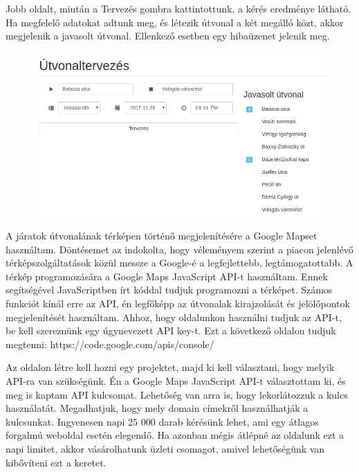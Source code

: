 Jobb oldalt, miután a Tervezés gombra kattintottunk, a kérés eredménye látható. Ha megfelelő adatokat adtunk meg, és létezik útvonal a két megálló közt, akkor megjelenik a javasolt útvonal. Ellenkező esetben egy hibaüzenet jelenik meg.

\begin{figure}[htb]
\centering
\includegraphics[scale=0.5]{kepek/trip_planner.png}
\caption{}
\label{fig:trip_planner}
\end{figure}


A járatok útvonalának térképen történő megjelenítésére a Google Mapset használtam. Döntésemet az indokolta, hogy véleményem szerint a piacon jelenlévő térképszolgáltatások közül messze a Google-é a legfejlettebb, legtámogatottabb. A térkép programozására a Google Maps JavaScript API-t használtam. Ennek segítségével JavaScriptben írt kóddal tudjuk programozni a térképet. Számos funkciót kínál erre az API, én legfőképp az útvonalak kirajzolását és jelölőpontok megjelenítését használtam. Ahhoz, hogy oldalunkon használni tudjuk az API-t, be kell szereznünk egy úgynevezett API key-t. Ezt a következő oldalon tudjuk megtenni: https://code.google.com/apis/console/

Az oldalon létre kell hozni egy projektet, majd ki kell választani, hogy melyik API-ra van szükségünk. Én a Google Maps JavaScript API-t választottam ki, és meg is kaptam API kulcsomat. Lehetőség van arra is, hogy lekorlátozzuk a kulcs használatát. Megadhatjuk, hogy mely domain címekről használhatják a kulcsunkat. Ingyenesen napi 25 000 darab kérésünk lehet, ami egy átlagos forgalmú weboldal esetén elegendő. Ha azonban mégis átlépné az oldalunk ezt a napi limitet, akkor vásárolhatunk üzleti csomagot, amivel lehetőségünk van kibővíteni ezt a keretet.

